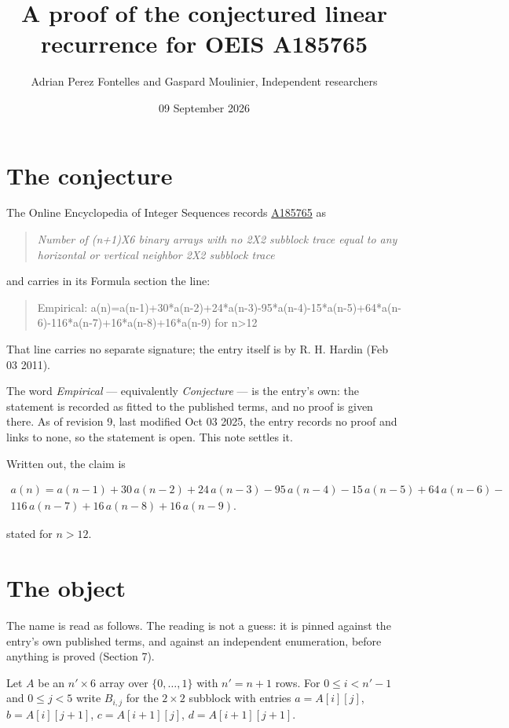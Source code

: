 \documentclass[11pt]{article}
\title{A proof of the conjectured linear recurrence for OEIS A185765}
\author{Adrian Perez Fontelles and Gaspard Moulinier, Independent researchers}
\date{09 September 2026}
\theoremstyle{definition}
\begin{document}
\maketitle
\section{The conjecture}

The Online Encyclopedia of Integer Sequences records \href{https://oeis.org/A185765}{A185765} as

\begin{quote}\itshape Number of (n+1)X6 binary arrays with no 2X2 subblock trace equal to any horizontal or vertical neighbor 2X2 subblock trace\end{quote}

and carries in its Formula section the line:

\begin{quote}\ttfamily Empirical: a(n)=a(n-1)+30*a(n-2)+24*a(n-3)-95*a(n-4)-15*a(n-5)+64*a(n-6)-116*a(n-7)+16*a(n-8)+16*a(n-9) for n>12\end{quote}

That line carries no separate signature; the entry itself is by R. H. Hardin (Feb 03 2011).

The word {\itshape Empirical} --- equivalently {\itshape Conjecture} --- is the entry's own: the statement is recorded as fitted to the published terms, and no proof is given there. As of revision 9, last modified Oct 03 2025, the entry records no proof and links to none, so the statement is open. This note settles it.

Written out, the claim is

\begin{multline*} a(n) = a(n-1) + 30\,a(n-2) + 24\,a(n-3) - 95\,a(n-4) - 15\,a(n-5) + 64\,a(n-6) - \\ 116\,a(n-7) + 16\,a(n-8) + 16\,a(n-9). \end{multline*}

stated for $n > 12$.

\section{The object}

The name is read as follows. The reading is not a guess: it is pinned against the entry's own published terms, and against an independent enumeration, before anything is proved (Section 7).

Let $A$ be an $n' \times 6$ array over $\{0,\dots,1\}$ with $n' = n + 1$ rows. For $0 \le i < n'-1$ and $0 \le j < 5$ write $B_{i,j}$ for the $2\times2$ subblock with entries $a = A[i][j]$, $b = A[i][j{+}1]$, $c = A[i{+}1][j]$, $d = A[i{+}1][j{+}1]$.
\end{document}
